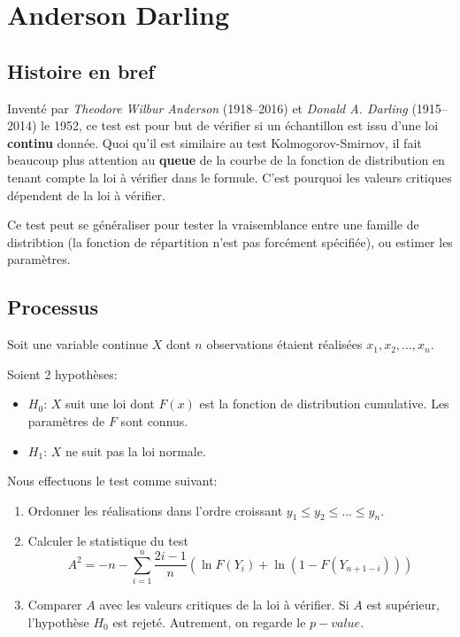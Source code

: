\documentclass[12pt,a4paper]{article}
\begin{document}
\section{Anderson Darling}
\subsection{Histoire en bref}
Inventé par \emph{Theodore Wilbur Anderson} (1918–2016) et \emph{Donald A. Darling} (1915–2014) le 1952, ce test est pour but de vérifier si un échantillon est issu d'une loi \textbf{continu} donnée. Quoi qu'il est similaire au test Kolmogorov-Smirnov, il fait beaucoup plus attention au \textbf{queue} de la courbe de la fonction de distribution en tenant compte la loi à vérifier dans le formule. C'est pourquoi les valeurs critiques dépendent de la loi à vérifier.

Ce test peut se généraliser pour tester la vraisemblance entre une famille de distribtion (la fonction de répartition n'est pas forcément spécifiée), ou estimer les paramètres.

\subsection{Processus}
Soit une variable continue $X$ dont $n$ observations étaient réalisées $x_1, x_2, ..., x_n$.

Soient 2 hypothèses: 
\begin{itemize}
\item $H_0$: $X$ suit une loi dont $F(x)$ est la fonction de distribution cumulative. Les paramètres de $F$ sont connus.
\item $H_1$: $X$ ne suit pas la loi normale.
\end{itemize}

Nous effectuons le test comme suivant:
\begin{enumerate}
\item Ordonner les réalisations dans l'ordre croissant $y_1 \leq y_2 \leq ... \leq y_n$.
\item Calculer le statistique du test
\[{A^2} =  - n - \sum\limits_{i = 1}^n {\frac{{2i - 1}}{n}\left( {\ln F\left( {{Y_i}} \right) + \ln \left( {1 - F\left( {{Y_{n + 1 - i}}} \right)} \right)} \right)} \]
\item Comparer $A$ avec les valeurs critiques de la loi à vérifier. Si $A$ est supérieur, l'hypothèse $H_0$ est rejeté. Autrement, on regarde le $p-value$.
\end{enumerate}
\end{document}
